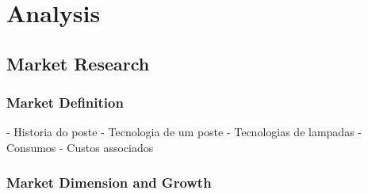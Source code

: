 \documentclass[12pt, letterpaper]{report}
\begin{document}
\chapter{Analysis}
\section{Market Research}

\subsection{Market Definition}



- Historia do poste
	- Tecnologia de um poste
- Tecnologias de lampadas
- Consumos
- Custos associados


\subsection{Market Dimension and Growth}




\end{document}
